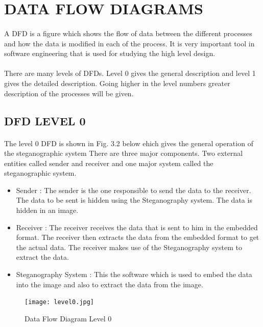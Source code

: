 \documentclass[12pt]{report}
\begin{document}
\section{DATA FLOW DIAGRAMS}
\paragraph{}A DFD is a figure which shows the flow of data between the different processes and how the data is modified in each of the process. It is very important tool in software engineering that is used for studying the high level design.\\
\paragraph{}There are many levels of DFDs. Level 0 gives the general description and level 1 gives the detailed description. Going higher in the level numbers greater description of the processes will be given.
\pagebreak
\subsection{DFD LEVEL 0}
\paragraph{}The level 0 DFD is shown in Fig. 3.2 below ehich gives the general operation of the steganographic system There are three major components. Two external entities called sender and receiver and one major system called the steganographic system.
\begin{itemize}
\item Sender : The sender is the one responsible to send the data to the receiver. The data to be sent is hidden using the Steganography system. The data is hidden in an image.
\item Receiver : The receiver receives the data that is sent to him in the embedded format. The receiver then extracts the data from the embedded format to get the actual data. The receiver makes use of the Steganography system to extract the data.
\item Steganography System : This the software which is used to embed the data into the image and also to extract the data from the image.
\end{itemize}
\begin{figure}[h!]
	\centering
		\texttt{[image: level0.jpg]}
		\caption{Data Flow Diagram Level 0}
\end{figure} 
\pagebreak
\end{document}
